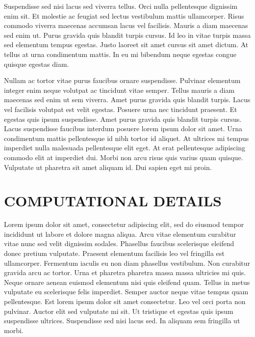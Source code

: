 \documentclass[journal=jctc, manuscript=article]{achemso}
\begin{document}
Suspendisse sed nisi lacus sed viverra tellus. Orci nulla pellentesque dignissim enim sit. Et molestie ac feugiat sed lectus vestibulum mattis ullamcorper. Risus commodo viverra maecenas accumsan lacus vel facilisis. Mauris a diam maecenas sed enim ut. Purus gravida quis blandit turpis cursus. Id leo in vitae turpis massa sed elementum tempus egestas. Justo laoreet sit amet cursus sit amet dictum. At tellus at urna condimentum mattis. In eu mi bibendum neque egestas congue quisque egestas diam.

Nullam ac tortor vitae purus faucibus ornare suspendisse. Pulvinar elementum integer enim neque volutpat ac tincidunt vitae semper. Tellus mauris a diam maecenas sed enim ut sem viverra. Amet purus gravida quis blandit turpis. Lacus vel facilisis volutpat est velit egestas. Posuere urna nec tincidunt praesent. Et egestas quis ipsum suspendisse. Amet purus gravida quis blandit turpis cursus. Lacus suspendisse faucibus interdum posuere lorem ipsum dolor sit amet. Urna condimentum mattis pellentesque id nibh tortor id aliquet. At ultrices mi tempus imperdiet nulla malesuada pellentesque elit eget. At erat pellentesque adipiscing commodo elit at imperdiet dui. Morbi non arcu risus quis varius quam quisque. Vulputate ut pharetra sit amet aliquam id. Dui sapien eget mi proin.


\section{COMPUTATIONAL DETAILS}

Lorem ipsum dolor sit amet, consectetur adipiscing elit, sed do eiusmod tempor incididunt ut labore et dolore magna aliqua. Arcu vitae elementum curabitur vitae nunc sed velit dignissim sodales. Phasellus faucibus scelerisque eleifend donec pretium vulputate. Praesent elementum facilisis leo vel fringilla est ullamcorper. Fermentum iaculis eu non diam phasellus vestibulum. Non curabitur gravida arcu ac tortor. Urna et pharetra pharetra massa massa ultricies mi quis. Neque ornare aenean euismod elementum nisi quis eleifend quam. Tellus in metus vulputate eu scelerisque felis imperdiet. Semper auctor neque vitae tempus quam pellentesque. Est lorem ipsum dolor sit amet consectetur. Leo vel orci porta non pulvinar. Auctor elit sed vulputate mi sit. Ut tristique et egestas quis ipsum suspendisse ultrices. Suspendisse sed nisi lacus sed. In aliquam sem fringilla ut morbi.
\end{document}
